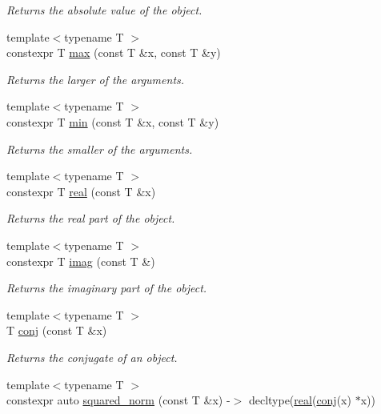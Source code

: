 \begin{DoxyCompactItemize}
\begin{DoxyCompactList}\small\item\em Returns the absolute value of the object. \end{DoxyCompactList}\item 
{\footnotesize template$<$typename T $>$ }\\constexpr T \hyperlink{namespacegko_af1812df45c6ec07780d579a12b64c753}{max} (const T \&x, const T \&y)
\begin{DoxyCompactList}\small\item\em Returns the larger of the arguments. \end{DoxyCompactList}\item 
{\footnotesize template$<$typename T $>$ }\\constexpr T \hyperlink{namespacegko_aaaf8487194bcb40b528969c187a413a0}{min} (const T \&x, const T \&y)
\begin{DoxyCompactList}\small\item\em Returns the smaller of the arguments. \end{DoxyCompactList}\item 
{\footnotesize template$<$typename T $>$ }\\constexpr T \hyperlink{namespacegko_ae23cfd886cee6e88d77bcbbbe1928b78}{real} (const T \&x)
\begin{DoxyCompactList}\small\item\em Returns the real part of the object. \end{DoxyCompactList}\item 
{\footnotesize template$<$typename T $>$ }\\constexpr T \hyperlink{namespacegko_a7ff1061513b10ccd5122015d2e5f9faa}{imag} (const T \&)
\begin{DoxyCompactList}\small\item\em Returns the imaginary part of the object. \end{DoxyCompactList}\item 
{\footnotesize template$<$typename T $>$ }\\T \hyperlink{namespacegko_acdaec5c4f959a948a6d0f3e99a57c7ea}{conj} (const T \&x)
\begin{DoxyCompactList}\small\item\em Returns the conjugate of an object. \end{DoxyCompactList}\item 
{\footnotesize template$<$typename T $>$ }\\constexpr auto \hyperlink{namespacegko_abbb55709b10d707b2cbef803832aa834}{squared\+\_\+norm} (const T \&x) -\/$>$ decltype(\hyperlink{namespacegko_ae23cfd886cee6e88d77bcbbbe1928b78}{real}(\hyperlink{namespacegko_acdaec5c4f959a948a6d0f3e99a57c7ea}{conj}(x) $\ast$x))

\end{DoxyCompactItemize}
